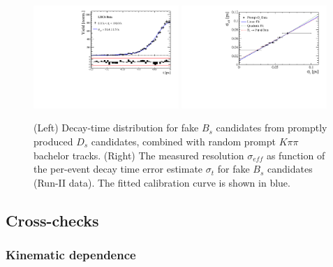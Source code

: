 \begin{figure}[h]
\centering
\includegraphics[height=!,width=0.49\textwidth]{figs/Resolution/SignalData_bin_all.pdf}
\includegraphics[height=!,width=0.49\textwidth]{figs/Resolution/ScaleFactor_Data.pdf}
\caption{ (Left) Decay-time distribution for fake $B_s$ candidates from promptly produced $D_s$ candidates, combined with random prompt $K\pi\pi$ bachelor tracks.
(Right) The measured resolution $\sigma_{eff}$ as function of the per-event decay time error estimate $\sigma_t$ for fake $B_s$ candidates (Run-II data).
The fitted calibration curve is shown in blue.}
\label{fig:scaleFactorData}
\end{figure}


\clearpage
\subsection{Cross-checks}

\subsubsection{Kinematic dependence}

